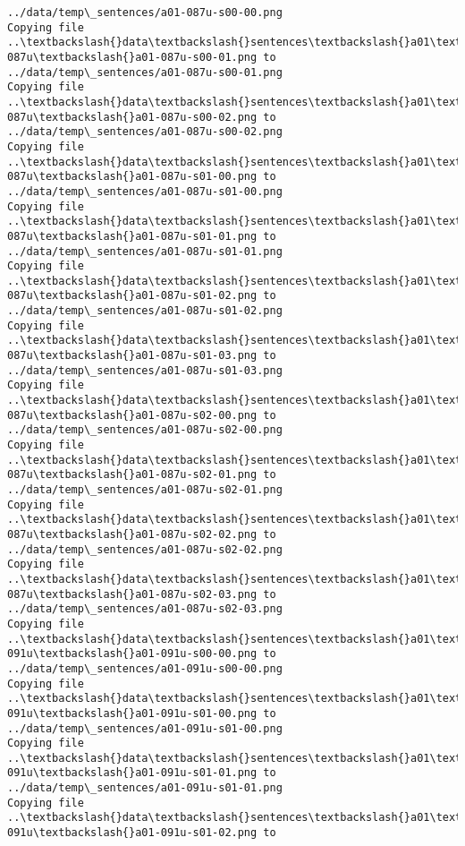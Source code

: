 \documentclass[11pt]{article}
\begin{document}
\begin{Verbatim}[commandchars=\\\{\}]
../data/temp\_sentences/a01-087u-s00-00.png
Copying file ..\textbackslash{}data\textbackslash{}sentences\textbackslash{}a01\textbackslash{}a01-087u\textbackslash{}a01-087u-s00-01.png to
../data/temp\_sentences/a01-087u-s00-01.png
Copying file ..\textbackslash{}data\textbackslash{}sentences\textbackslash{}a01\textbackslash{}a01-087u\textbackslash{}a01-087u-s00-02.png to
../data/temp\_sentences/a01-087u-s00-02.png
Copying file ..\textbackslash{}data\textbackslash{}sentences\textbackslash{}a01\textbackslash{}a01-087u\textbackslash{}a01-087u-s01-00.png to
../data/temp\_sentences/a01-087u-s01-00.png
Copying file ..\textbackslash{}data\textbackslash{}sentences\textbackslash{}a01\textbackslash{}a01-087u\textbackslash{}a01-087u-s01-01.png to
../data/temp\_sentences/a01-087u-s01-01.png
Copying file ..\textbackslash{}data\textbackslash{}sentences\textbackslash{}a01\textbackslash{}a01-087u\textbackslash{}a01-087u-s01-02.png to
../data/temp\_sentences/a01-087u-s01-02.png
Copying file ..\textbackslash{}data\textbackslash{}sentences\textbackslash{}a01\textbackslash{}a01-087u\textbackslash{}a01-087u-s01-03.png to
../data/temp\_sentences/a01-087u-s01-03.png
Copying file ..\textbackslash{}data\textbackslash{}sentences\textbackslash{}a01\textbackslash{}a01-087u\textbackslash{}a01-087u-s02-00.png to
../data/temp\_sentences/a01-087u-s02-00.png
Copying file ..\textbackslash{}data\textbackslash{}sentences\textbackslash{}a01\textbackslash{}a01-087u\textbackslash{}a01-087u-s02-01.png to
../data/temp\_sentences/a01-087u-s02-01.png
Copying file ..\textbackslash{}data\textbackslash{}sentences\textbackslash{}a01\textbackslash{}a01-087u\textbackslash{}a01-087u-s02-02.png to
../data/temp\_sentences/a01-087u-s02-02.png
Copying file ..\textbackslash{}data\textbackslash{}sentences\textbackslash{}a01\textbackslash{}a01-087u\textbackslash{}a01-087u-s02-03.png to
../data/temp\_sentences/a01-087u-s02-03.png
Copying file ..\textbackslash{}data\textbackslash{}sentences\textbackslash{}a01\textbackslash{}a01-091u\textbackslash{}a01-091u-s00-00.png to
../data/temp\_sentences/a01-091u-s00-00.png
Copying file ..\textbackslash{}data\textbackslash{}sentences\textbackslash{}a01\textbackslash{}a01-091u\textbackslash{}a01-091u-s01-00.png to
../data/temp\_sentences/a01-091u-s01-00.png
Copying file ..\textbackslash{}data\textbackslash{}sentences\textbackslash{}a01\textbackslash{}a01-091u\textbackslash{}a01-091u-s01-01.png to
../data/temp\_sentences/a01-091u-s01-01.png
Copying file ..\textbackslash{}data\textbackslash{}sentences\textbackslash{}a01\textbackslash{}a01-091u\textbackslash{}a01-091u-s01-02.png to

\end{Verbatim}
\end{document}
